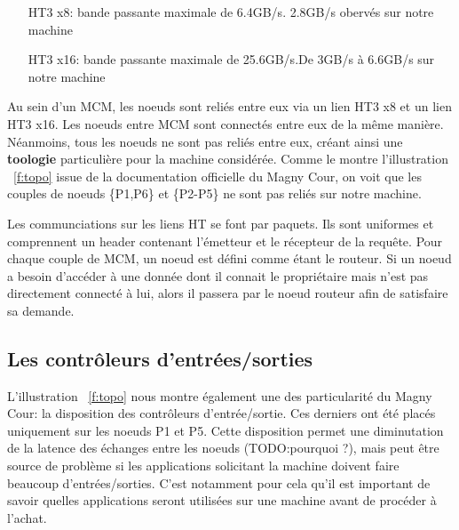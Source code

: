     \begin{itemize}
      \item[HT3 x8:] bande passante maximale de 6.4GB/s. 2.8GB/s obervés sur notre
      machine\cite{Lepers2014}
      \item[HT3 x16:] bande passante maximale de 25.6GB/s.De 3GB/s à 6.6GB/s sur
      notre machine\cite{Lepers2014}
    \end{itemize}

    Au sein d'un MCM, les noeuds sont reliés entre eux via un lien HT3 x8 et un
    lien HT3 x16. Les noeuds entre MCM sont connectés entre eux de la même
    manière. Néanmoins, tous les noeuds ne sont pas reliés entre eux, créant
    ainsi une \textbf{toologie} particulière pour la machine considérée. Comme
    le montre l'illustration ~\ref{f:topo} issue de la documentation officielle
    du Magny Cour, on voit que les couples de noeuds \{P1,P6\} et \{P2-P5\} ne
    sont pas reliés sur notre machine.


    Les communciations sur les liens HT se font par
    paquets\cite{CacheHierarchy}. Ils sont uniformes et comprennent un header
    contenant l'émetteur et le récepteur de la requête. Pour chaque couple de
    MCM, un noeud est défini comme étant le routeur. Si un noeud a besoin
    d'accéder à une donnée dont il connait le propriétaire mais n'est pas
    directement connecté à lui, alors il passera par le noeud routeur afin de
    satisfaire sa demande.


  \subsection{Les contrôleurs d'entrées/sorties}

    L'illustration ~\ref{f:topo} nous montre également une des particularité du
    Magny Cour: la disposition des contrôleurs d'entrée/sortie. Ces derniers ont
    été placés uniquement sur les noeuds P1 et P5. Cette disposition permet une
    diminutation de la latence des échanges entre les noeuds (TODO:pourquoi ?),
    mais peut être source de problème si les applications solicitant la machine
    doivent faire beaucoup d'entrées/sorties. C'est notamment pour cela qu'il
    est important de savoir quelles applications seront utilisées sur une
    machine avant de procéder à l'achat.


